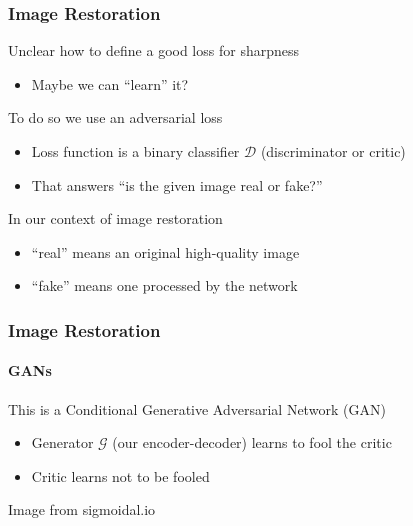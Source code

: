 \documentclass[xetex,professionalfont]{beamer}
\renewcommand\emph[1]{\textcolor{tuwcvl_cvl_blue}{#1}}
\newcommand{\cD}{\mathcal{D}}
\newcommand{\cG}{\mathcal{G}}
\begin{document}
\begin{frame}
	\frametitle{Image Restoration}

	Unclear how to define a good loss for sharpness
	\begin{itemize}
		\item Maybe we can \enquote{learn} it?
	\end{itemize}

	\bigskip
	To do so we use an \emph{adversarial loss}
	\begin{itemize}
		\item Loss function is a binary classifier $\cD$ (\emph{discriminator} or \emph{critic})
		\item That answers \enquote{is the given image real or fake?} %
	\end{itemize}

	\bigskip
	In our context of image restoration
	\begin{itemize}
		\item \enquote{real} means an original high-quality image
		\item \enquote{fake} means one processed by the network
	\end{itemize}
\end{frame}


\begin{frame}
	\frametitle{Image Restoration}
	\framesubtitle{GANs}

	This is a \emph{Conditional Generative Adversarial Network} (\emph{GAN})
	\begin{itemize}
		\item \emph{Generator} $\cG$ (our encoder-decoder) learns to fool the critic
		\item Critic learns not to be fooled
	\end{itemize}

	\smallskip
	\begin{center}
		{\centering Image from sigmoidal.io}
	\end{center}
\end{frame}
\end{document}
